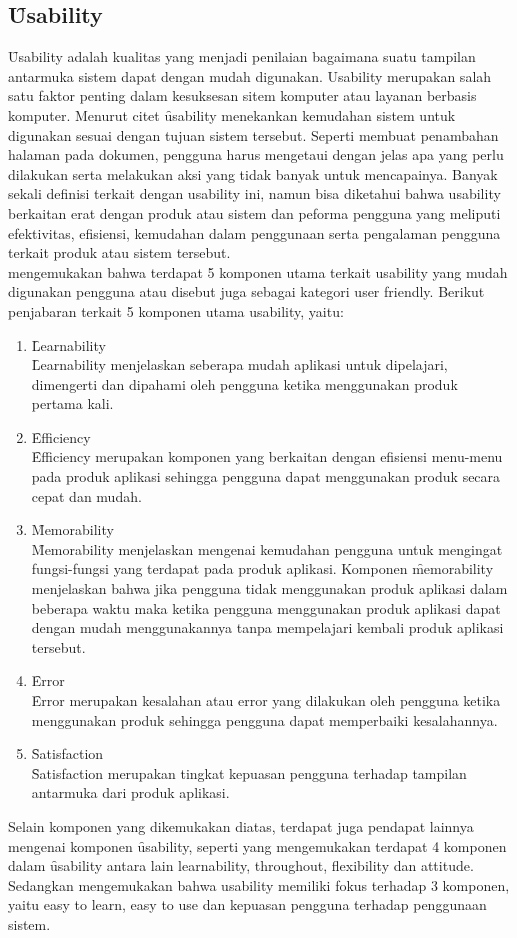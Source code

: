 \subsection{\f{Usability}}
\f{Usability} adalah kualitas yang menjadi penilaian bagaimana suatu tampilan antarmuka sistem dapat dengan mudah digunakan. Usability merupakan salah satu faktor penting dalam kesuksesan sitem komputer atau layanan berbasis komputer. Menurut citet{} \f{usability} menekankan kemudahan sistem untuk digunakan sesuai dengan tujuan sistem tersebut. Seperti membuat penambahan halaman pada dokumen, pengguna harus mengetaui dengan jelas apa yang perlu dilakukan serta melakukan aksi yang tidak banyak untuk mencapainya.
Banyak sekali definisi terkait dengan usability ini, namun bisa diketahui bahwa usability berkaitan erat dengan produk atau sistem dan peforma pengguna yang meliputi efektivitas, efisiensi, kemudahan dalam penggunaan serta pengalaman pengguna terkait produk atau sistem tersebut.
\newline\\
\citet{} mengemukakan bahwa terdapat 5 komponen utama terkait usability yang mudah digunakan pengguna atau disebut juga sebagai kategori user friendly. Berikut penjabaran terkait 5 komponen utama usability, yaitu:
\begin{enumerate}
	\item \f{Learnability}\\
	\f{Learnability} menjelaskan seberapa mudah aplikasi untuk dipelajari, dimengerti dan dipahami oleh pengguna ketika menggunakan produk pertama kali.
	\item \f{Efficiency}\\
	\f{Efficiency} merupakan komponen yang berkaitan dengan efisiensi menu-menu pada produk aplikasi sehingga pengguna dapat menggunakan produk secara cepat dan mudah.
	\item \f{Memorability}\\
	\f{Memorability} menjelaskan mengenai kemudahan pengguna untuk mengingat fungsi-fungsi yang terdapat pada produk aplikasi. Komponen \f{memorability} menjelaskan bahwa jika pengguna tidak menggunakan produk aplikasi dalam beberapa waktu maka ketika pengguna menggunakan produk aplikasi dapat dengan mudah menggunakannya tanpa mempelajari kembali produk aplikasi tersebut.
	\item \f{Error}\\
	\f{Error} merupakan kesalahan atau error yang dilakukan oleh pengguna ketika menggunakan produk sehingga pengguna dapat memperbaiki kesalahannya.
	\item \f{Satisfaction}\\
	\f{Satisfaction} merupakan tingkat kepuasan pengguna terhadap tampilan antarmuka dari produk aplikasi.
\end{enumerate}
Selain komponen yang dikemukakan \citeauthor{} diatas, terdapat juga pendapat lainnya mengenai komponen \f{usability}, seperti \citet{} yang mengemukakan terdapat 4 komponen dalam \f{usability} antara lain learnability, throughout, flexibility dan attitude. Sedangkan \citet{} mengemukakan bahwa usability memiliki fokus terhadap 3 komponen, yaitu easy to learn, easy to use dan kepuasan pengguna terhadap penggunaan sistem.
